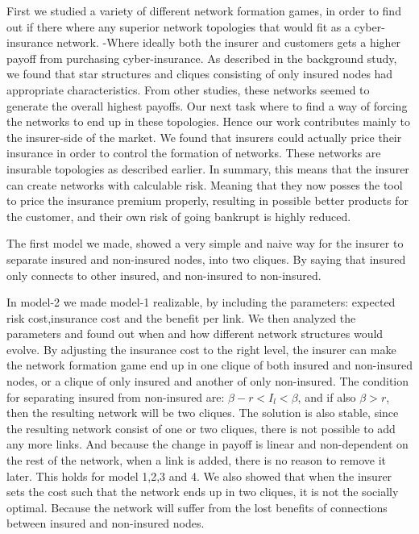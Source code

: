 First we studied a variety of different network formation games, in order to find out if there where any superior network topologies that would fit as a cyber-insurance network. -Where ideally both the insurer and customers gets a higher payoff from purchasing cyber-insurance. As described in the background study, we found that star structures and cliques consisting of only insured nodes had appropriate characteristics.  From other studies, these networks seemed to generate the overall highest payoffs. Our next task where to find a way of forcing the networks to end up in these topologies. Hence our work contributes mainly to the insurer-side of the market. We found that insurers could actually price their insurance in order to control the formation of networks. These networks are insurable topologies as described earlier. In summary, this means that the insurer can create networks with calculable risk. Meaning that they now posses the tool to price the insurance premium properly, resulting in possible better products for the customer, and their own risk of going bankrupt is highly reduced.

The first model we made, showed a very simple and naive way for the insurer to separate insured and non-insured nodes, into two cliques. By saying that insured only connects to other insured, and non-insured to non-insured. 

 In model-2 we made model-1 realizable, by including the parameters: expected risk cost,insurance cost and the benefit per link. We then analyzed the parameters and found out when and how different network structures would evolve. By adjusting the insurance cost to the right level, the insurer can make the network formation game end up in one clique of both insured and non-insured nodes, or a clique of only insured and another of only non-insured. The condition for separating insured from non-insured are: $\beta-r<I_{l}<\beta$, and if also $\beta>r$, then the resulting network will be two cliques. The solution is also stable, since the resulting network consist of one or two cliques, there is not possible to add any more links. And because the change in payoff is linear and non-dependent on the rest of the network,   when a link is added, there is no reason to remove it later. This holds for model 1,2,3 and 4.
We also showed that when the insurer sets the cost such that the network ends up in two cliques, it is not the socially optimal. Because the network will suffer from the lost benefits of connections between insured and non-insured nodes.

